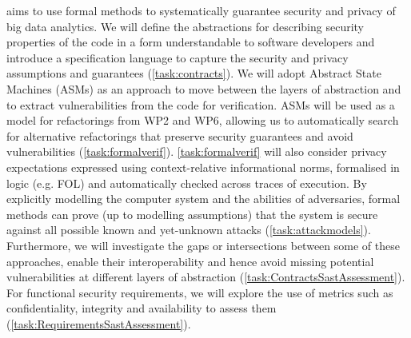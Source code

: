 \begin{Workpackage}{\thewpno}

\begin{WPDescription}
\theWP{} aims to use formal methods to systematically guarantee security and privacy of big data analytics.
We will define the abstractions for describing security properties of the code in a form understandable to software developers and introduce a specification language to capture the security and privacy assumptions and guarantees (\ref{task:contracts}). We will adopt Abstract State Machines (ASMs) as an approach to move between the layers of abstraction and to extract vulnerabilities from the code for verification. ASMs will be used as a model for refactorings from WP2 and WP6, allowing us to automatically search for alternative refactorings that preserve security guarantees and avoid vulnerabilities (\ref{task:formalverif}). \ref{task:formalverif} will also consider privacy expectations expressed using context-relative informational norms, formalised in logic (e.g. FOL) and automatically checked across traces of execution. By explicitly modelling the computer system and the abilities of adversaries, formal methods can prove (up to modelling assumptions) that the system is secure against all possible known and yet-unknown attacks (\ref{task:attackmodels}). Furthermore, we will investigate the gaps or intersections between some of these approaches, enable their interoperability and hence avoid missing potential vulnerabilities at different layers of abstraction (\ref{task:ContractsSastAssessment}). For functional security requirements, we will explore the use of metrics such as confidentiality, integrity and availability to assess them (\ref{task:RequirementsSastAssessment}).
\end{WPDescription}


\end{Workpackage}

